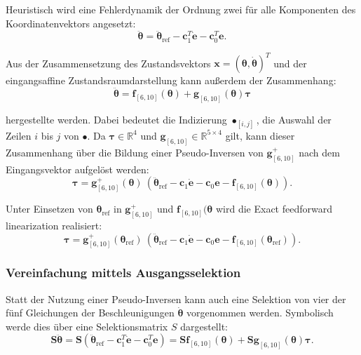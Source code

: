 Heuristisch wird eine Fehlerdynamik der Ordnung zwei für alle Komponenten des Koordinatenvektors angesetzt:
\begin{equation}
	\ddot{\pmb{\theta}} = \ddot{\pmb{\theta}}_{\text{ref}} - \pmb{c}_1^T \dot{\pmb{e}} - \pmb{c}_0^T \pmb{e}.
\end{equation}

Aus der Zusammensetzung des Zustandsvektors $\pmb{x} = (\pmb{\theta}, \dot{\pmb{\theta}})^T$ und der eingangsaffine Zustandsraumdarstellung kann außerdem der Zusammenhang:
\begin{equation}
	\ddot{\pmb{\theta}} = \pmb{f}_{[6, 10]}(\pmb{\theta}) + \pmb{g}_{[6, 10]}(\pmb{\theta}) \pmb{\tau}
\end{equation}

hergestellte werden. Dabei bedeutet die Indizierung $\bullet_{[i, j]}$, die Auswahl der Zeilen $i$ bis $j$ von $\bullet$. Da $\pmb{\tau} \in \mathbb{R}^4$ und $\pmb{g}_{[6, 10]} \in \mathbb{R}^{5 \times 4}$ gilt, kann dieser Zusammenhang über die Bildung einer Pseudo-Inversen von $\pmb{g}_{[6, 10]}^+$ nach dem Eingangsvektor aufgelöst werden:
\begin{equation}
	\pmb{\tau}= \pmb{g}^{+}_{[6, 10]} (\pmb{\theta}) \ (\ddot{\pmb{\theta}}_{\text{ref}} - \pmb{c}_{1} \pmb{\dot{e}} - \pmb{c}_{0} \pmb{e} - \pmb{f}_{[6, 10]}(\pmb{\theta})).
\end{equation} 

Unter Einsetzen von $\pmb{\theta}_{\text{ref}}$ in $\pmb{g}_{[6, 10]}^+$ und $\pmb{f}_{[6, 10]}(\pmb{\theta}$ wird die Exact feedforward linearization realisiert:
\begin{equation}
\pmb{\tau}= \pmb{g}^{+}_{[6, 10]} (\pmb{\theta}_{\text{ref}}) \ (\ddot{\pmb{\theta}}_{\text{ref}} - \pmb{c}_{1} \pmb{\dot{e}} - \pmb{c}_{0} \pmb{e} - \pmb{f}_{[6, 10]}(\pmb{\theta}_{\text{ref}})).
\end{equation} 

\subsubsection{Vereinfachung mittels Ausgangsselektion}
Statt der Nutzung einer Pseudo-Inversen kann auch eine Selektion von vier der fünf Gleichungen der Beschleunigungen $\dot{\pmb{\theta}}$ vorgenommen werden. Symbolisch werde dies über eine Selektionsmatrix $S$ dargestellt:
\begin{equation}
	\pmb{S} \ddot{\pmb{\theta}} = \pmb{S}(\ddot{\pmb{\theta}}_{\text{ref}} - \pmb{c}_1^T \dot{\pmb{e}} - \pmb{c}_0^T \pmb{e}) = \pmb{S} \pmb{f}_{[6, 10]}(\pmb{\theta}) + \pmb{S} \pmb{g}_{[6, 10]}(\pmb{\theta}) \pmb{\tau}.
\end{equation} 

